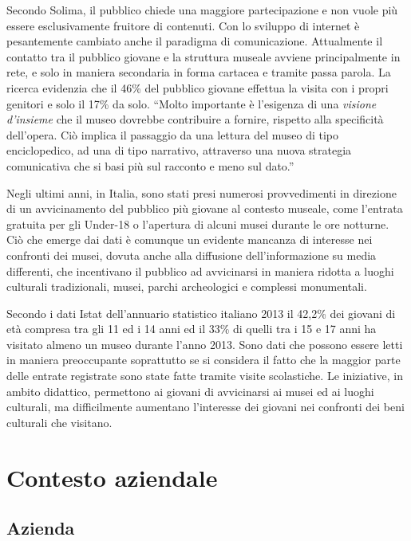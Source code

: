 Secondo Solima, il pubblico chiede una maggiore partecipazione e non vuole più essere esclusivamente fruitore di contenuti. Con lo sviluppo di internet è pesantemente cambiato anche il paradigma di comunicazione. Attualmente il contatto tra il pubblico giovane e la struttura museale avviene principalmente in rete, e solo in maniera secondaria in forma cartacea e tramite passa parola.
La ricerca evidenzia che il 46\% del pubblico giovane effettua la visita con i propri genitori e solo il 17\% da solo. “Molto importante è l'esigenza di una \textit{visione d'insieme} che il museo dovrebbe contribuire a fornire, rispetto alla specificità dell'opera. Ciò implica il passaggio da una lettura del museo di tipo enciclopedico, ad una di tipo narrativo, attraverso una nuova strategia comunicativa che si basi più sul racconto e meno sul dato.”

Negli ultimi anni, in Italia, sono stati presi numerosi provvedimenti in direzione di un avvicinamento del pubblico più giovane al contesto museale, come l’entrata gratuita per gli Under-18 o l’apertura di alcuni musei durante le ore notturne. Ciò che emerge dai dati è comunque un evidente mancanza di interesse nei confronti dei musei, dovuta anche alla diffusione dell’informazione su media differenti, che incentivano il pubblico ad avvicinarsi in maniera ridotta a luoghi culturali tradizionali, musei, parchi archeologici e complessi monumentali.

Secondo i dati Istat dell'annuario statistico italiano 2013 \cite{DatiIstatMusei} il 42,2\% dei giovani di età compresa tra gli 11 ed i 14 anni ed il 33\% di quelli tra i 15 e 17 anni ha visitato almeno un museo durante l’anno 2013. Sono dati che possono essere letti in maniera preoccupante soprattutto se si considera il fatto che la maggior parte delle entrate registrate sono state fatte tramite visite scolastiche. Le iniziative, in ambito didattico, permettono ai giovani di avvicinarsi ai musei ed ai luoghi culturali, ma difficilmente aumentano l’interesse dei giovani nei confronti dei beni culturali che visitano.  

\section{Contesto aziendale}
\label{sec:contesto_aziendale}

\subsection{Azienda}
\label{sec:azienda}

